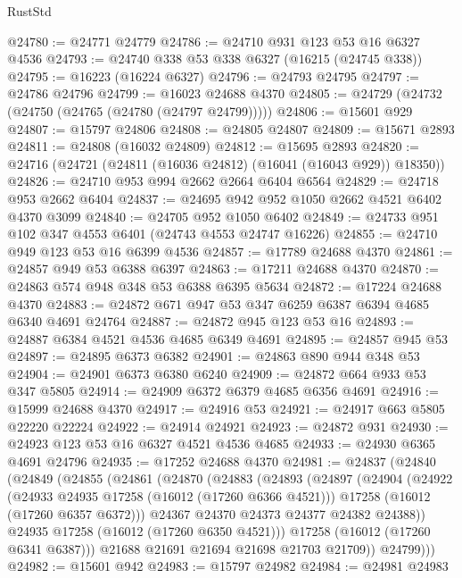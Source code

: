 \begin{lexlean}{RustStd}
\begin{coremodule}
@24780 := @24771 @24779
@24786 := @24710 @931 @123 @53 @16 @6327 @4536
@24793 := @24740 @338 @53 @338 @6327 (@16215 (@24745 @338))
@24795 := @16223 (@16224 @6327)
@24796 := @24793 @24795
@24797 := @24786 @24796
@24799 := @16023 @24688 @4370
@24805 := @24729 (@24732 (@24750 (@24765 (@24780 (@24797 @24799)))))
@24806 := @15601 @929
@24807 := @15797 @24806
@24808 := @24805 @24807
@24809 := @15671 @2893
@24811 := @24808 (@16032 @24809)
@24812 := @15695 @2893
@24820 := @24716 (@24721 (@24811 (@16036 @24812) (@16041 (@16043 @929)) @18350))
@24826 := @24710 @953 @994 @2662 @2664 @6404 @6564
@24829 := @24718 @953 @2662 @6404
@24837 := @24695 @942 @952 @1050 @2662 @4521 @6402 @4370 @3099
@24840 := @24705 @952 @1050 @6402
@24849 := @24733 @951 @102 @347 @4553 @6401 (@24743 @4553 @24747 @16226)
@24855 := @24710 @949 @123 @53 @16 @6399 @4536
@24857 := @17789 @24688 @4370
@24861 := @24857 @949 @53 @6388 @6397
@24863 := @17211 @24688 @4370
@24870 := @24863 @574 @948 @348 @53 @6388 @6395 @5634
@24872 := @17224 @24688 @4370
@24883 := @24872 @671 @947 @53 @347 @6259 @6387 @6394 @4685 @6340 @4691 @24764
@24887 := @24872 @945 @123 @53 @16
@24893 := @24887 @6384 @4521 @4536 @4685 @6349 @4691
@24895 := @24857 @945 @53
@24897 := @24895 @6373 @6382
@24901 := @24863 @890 @944 @348 @53
@24904 := @24901 @6373 @6380 @6240
@24909 := @24872 @664 @933 @53 @347 @5805
@24914 := @24909 @6372 @6379 @4685 @6356 @4691
@24916 := @15999 @24688 @4370
@24917 := @24916 @53
@24921 := @24917 @663 @5805 @22220 @22224
@24922 := @24914 @24921
@24923 := @24872 @931
@24930 := @24923 @123 @53 @16 @6327 @4521 @4536 @4685
@24933 := @24930 @6365 @4691 @24796
@24935 := @17252 @24688 @4370
@24981 := @24837
    (@24840
      (@24849
        (@24855
          (@24861
            (@24870
              (@24883
                (@24893
                  (@24897
                    (@24904
                      (@24922
                        (@24933 @24935 @17258 (@16012 (@17260 @6366 @4521)))
                        @17258
                        (@16012 (@17260 @6357 @6372)))
                      @24367
                      @24370
                      @24373
                      @24377
                      @24382
                      @24388))
                  @24935
                  @17258
                  (@16012 (@17260 @6350 @4521)))
                @17258
                (@16012 (@17260 @6341 @6387)))
              @21688
              @21691
              @21694
              @21698
              @21703
              @21709))
          @24799)))
@24982 := @15601 @942
@24983 := @15797 @24982
@24984 := @24981 @24983

\end{coremodule}
\end{lexlean}
